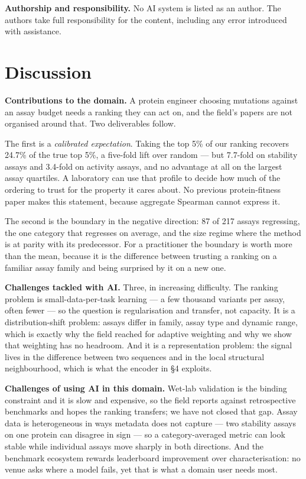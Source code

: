 \documentclass[sigconf,review,nonacm]{acmart}
\begin{document}
\textbf{Authorship and responsibility.} No AI system is listed as an author. The authors take full
responsibility for the content, including any error introduced with assistance.

\section{Discussion}\label{discussion}

\textbf{Contributions to the domain.} A protein engineer choosing mutations against an assay budget needs a
ranking they can act on, and the field's papers are not organised around that. Two deliverables follow.

The first is a \emph{calibrated expectation}. Taking the top 5\% of our ranking recovers 24.7\% of the true top
5\%, a five-fold lift over random --- but 7.7-fold on stability assays and 3.4-fold on activity assays, and
no advantage at all on the largest assay quartiles. A laboratory can use that profile to decide how much
of the ordering to trust for the property it cares about. No previous protein-fitness paper makes this
statement, because aggregate Spearman cannot express it.

The second is the boundary in the negative direction: 87 of 217 assays regressing, the one category that
regresses on average, and the size regime where the method is at parity with its predecessor. For a
practitioner the boundary is worth more than the mean, because it is the difference between trusting a
ranking on a familiar assay family and being surprised by it on a new one.

\textbf{Challenges tackled with AI.} Three, in increasing difficulty. The ranking problem is small-data-per-task
learning --- a few thousand variants per assay, often fewer --- so the question is regularisation and
transfer, not capacity. It is a distribution-shift problem: assays differ in family, assay type and
dynamic range, which is exactly why the field reached for adaptive weighting and why we show that
weighting has no headroom. And it is a representation problem: the signal lives in the difference between
two sequences and in the local structural neighbourhood, which is what the encoder in §4 exploits.

\textbf{Challenges of using AI in this domain.} Wet-lab validation is the binding constraint and it is slow
and expensive, so the field reports against retrospective benchmarks and hopes the ranking transfers; we
have not closed that gap. Assay data is heterogeneous in ways metadata does not capture --- two stability
assays on one protein can disagree in sign --- so a category-averaged metric can look stable while
individual assays move sharply in both directions. And the benchmark ecosystem rewards leaderboard
improvement over characterisation: no venue asks where a model fails, yet that is what a domain user
needs most.
\end{document}
